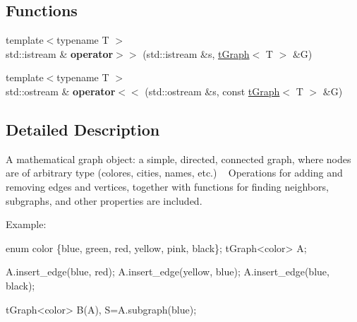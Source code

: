 \subsection*{Functions}
\begin{DoxyCompactItemize}
\item 
\mbox{\label{namespace_n_graph_a619633fcec087680ab8d90510eade326}} 
{\footnotesize template$<$typename T $>$ }\\std\+::istream \& {\bfseries operator$>$$>$} (std\+::istream \&s, \mbox{\hyperlink{class_n_graph_1_1t_graph}{t\+Graph}}$<$ T $>$ \&G)
\item 
\mbox{\label{namespace_n_graph_a8118891761ec5e37cfd25efa666c73d8}} 
{\footnotesize template$<$typename T $>$ }\\std\+::ostream \& {\bfseries operator$<$$<$} (std\+::ostream \&s, const \mbox{\hyperlink{class_n_graph_1_1t_graph}{t\+Graph}}$<$ T $>$ \&G)
\end{DoxyCompactItemize}


\subsection{Detailed Description}
A mathematical graph object\+: a simple, directed, connected graph, where nodes are of arbitrary type (colores, cities, names, etc.) ~\newline
 Operations for adding and removing edges and vertices, together with functions for finding neighbors, subgraphs, and other properties are included. 

Example\+:


\begin{DoxyPre}
    enum color \{blue, green, red, yellow, pink, black\};
    tGraph<color> A;\end{DoxyPre}



\begin{DoxyPre}    A.insert\_edge(blue, red);
    A.insert\_edge(yellow, blue);
    A.insert\_edge(blue, black);\end{DoxyPre}



\begin{DoxyPre}    tGraph<color> B(A), S=A.subgraph(blue);\end{DoxyPre}



\begin{DoxyPre}\end{DoxyPre}
 